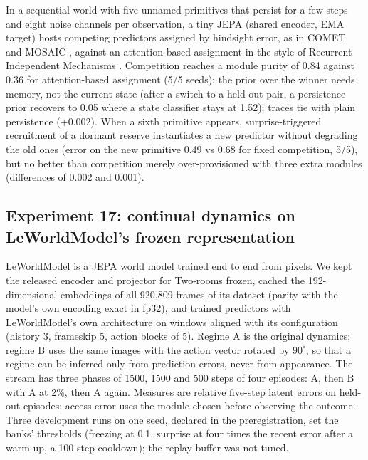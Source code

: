 \documentclass[11pt,a4paper]{article}
\begin{document}
In a sequential world with five unnamed primitives that persist for a few steps and eight noise channels per observation, a tiny JEPA (shared encoder, EMA target) hosts competing predictors assigned by hindsight error, as in COMET \citep{comet2024} and MOSAIC \citep{mosaic2001}, against an attention-based assignment in the style of Recurrent Independent Mechanisms \citep{goyal2021rim}. Competition reaches a module purity of 0.84 against 0.36 for attention-based assignment (5/5 seeds); the prior over the winner needs memory, not the current state (after a switch to a held-out pair, a persistence prior recovers to 0.05 where a state classifier stays at 1.52); traces tie with plain persistence ($+0.002$). When a sixth primitive appears, surprise-triggered recruitment of a dormant reserve instantiates a new predictor without degrading the old ones (error on the new primitive 0.49 vs 0.68 for fixed competition, 5/5), but no better than competition merely over-provisioned with three extra modules (differences of 0.002 and 0.001).

\subsection{Experiment 17: continual dynamics on LeWorldModel's frozen representation}
\label{sec:exp17}

LeWorldModel \citep{lewm2026} is a JEPA world model trained end to end from pixels. We kept the released encoder and projector for Two-rooms frozen, cached the 192-dimensional embeddings of all 920,809 frames of its dataset (parity with the model's own encoding exact in fp32), and trained predictors with LeWorldModel's own architecture on windows aligned with its configuration (history 3, frameskip 5, action blocks of 5). Regime A is the original dynamics; regime B uses the same images with the action vector rotated by $90^\circ$, so that a regime can be inferred only from prediction errors, never from appearance. The stream has three phases of 1500, 1500 and 500 steps of four episodes: A, then B with A at 2\%, then A again. Measures are relative five-step latent errors on held-out episodes; access error uses the module chosen before observing the outcome. Three development runs on one seed, declared in the preregistration, set the banks' thresholds (freezing at 0.1, surprise at four times the recent error after a warm-up, a 100-step cooldown); the replay buffer was not tuned.
\end{document}
